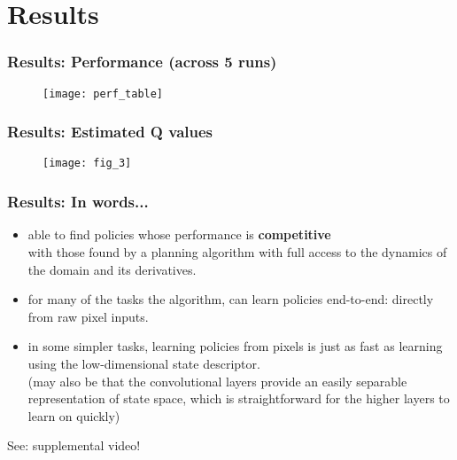 \section{Results}

\begin{frame}
\frametitle{Results: Performance (across 5 runs)}
\begin{figure}
    \centering
    \texttt{[image: perf\_table]}
\end{figure}
\end{frame}

\begin{frame}
\frametitle{Results: Estimated Q values}

\begin{figure}
    \centering
    \texttt{[image: fig\_3]}
\end{figure}

\end{frame}

\begin{frame}
\frametitle{Results: In words...}

\begin{itemize}
  \item able to find policies whose performance is \textbf{competitive} \\
  with those found by a planning algorithm with full access to the dynamics of the domain and its derivatives.
  \item for many of the tasks the algorithm, can learn policies end-to-end: directly from raw pixel inputs.
  \item in some simpler tasks, learning policies from pixels is just as fast as learning using the low-dimensional state descriptor.\\
  (may also be that the convolutional layers provide an easily separable representation of state space,
  which is straightforward for the higher layers to learn on quickly)
\end{itemize}

See: supplemental video!
\end{frame}
